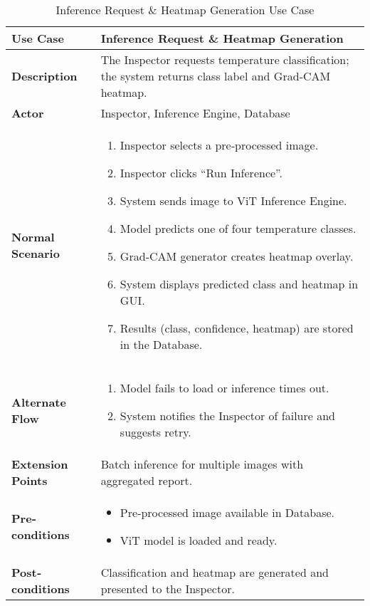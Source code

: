 \newpage

\begin{table}[h!]
    \centering
    \fontsize{10}{12}\selectfont
    \caption{Inference Request \& Heatmap Generation Use Case}
    \label{tab:inference_request}
    \begin{tabular}{|l|p{10cm}|}
        \hline
        \textbf{Use Case}         & Inference Request \& Heatmap Generation                                 \\ \hline
        \textbf{Description}      & The Inspector requests temperature classification; the system returns class label and Grad‐CAM heatmap. \\ \hline
        \textbf{Actor}            & Inspector, Inference Engine, Database                                     \\ \hline
        \textbf{Normal Scenario}  &
        \begin{enumerate}
            \item Inspector selects a pre‐processed image.
            \item Inspector clicks “Run Inference”.
            \item System sends image to ViT Inference Engine.
            \item Model predicts one of four temperature classes.
            \item Grad‐CAM generator creates heatmap overlay.
            \item System displays predicted class and heatmap in GUI.
            \item Results (class, confidence, heatmap) are stored in the Database.
        \end{enumerate}                                                          \\ \hline
        \textbf{Alternate Flow}   &
        \begin{enumerate}
            \item Model fails to load or inference times out.
            \item System notifies the Inspector of failure and suggests retry.
        \end{enumerate}                                                          \\ \hline
        \textbf{Extension Points} & Batch inference for multiple images with aggregated report.               \\ \hline
        \textbf{Pre‐conditions}   &
        \begin{itemize}
            \item Pre‐processed image available in Database.
            \item ViT model is loaded and ready.
        \end{itemize}                                                             \\ \hline
        \textbf{Post‐conditions}  & Classification and heatmap are generated and presented to the Inspector.   \\ \hline
    \end{tabular}
\end{table}

